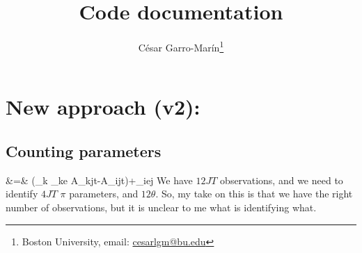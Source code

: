 \documentclass[a4paper, 12pt]{article}
\title{Code documentation}
\author{C\'esar Garro-Mar\'in\thanks{Boston University, email: \href{mailto:cesarlgm@bu.edu}{cesarlgm@bu.edu}}}
\begin{document}
\maketitle

%
%
%
%


\section{New approach (v2):}
\subsection{Counting parameters}
\beqns
\Delta {}&=& \left(\sum_k \theta_{ke} \Delta \ln A_{kjt}-\Delta \ln A_{ijt}\right)+\varepsilon_{iej} \label{eq:skills_eq} 
\eeqns
We have $12JT$ observations, and we need to identify $4JT$ $\pi$ parameters, and $12\theta$. So, my take on this is that we have the right number of observations, but it is unclear to me what is identifying what.
\end{document}
